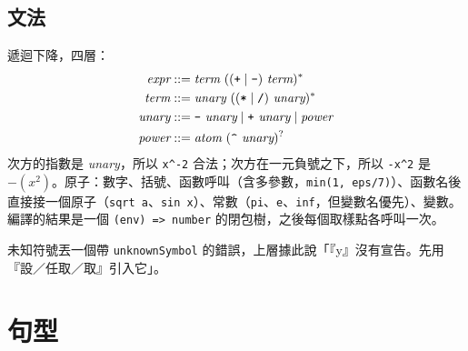 \documentclass[11pt,a4paper,oneside]{book}
\renewcommand{\_}{\ifmmode\origunderscore\else\textunderscore\allowbreak\fi}
\newcommand{\code}[1]{\texttt{#1}}
\begin{document}
\section{文法}
遞迴下降，四層：
\[
\begin{aligned}
\textit{expr} &::= \textit{term}\ ((\texttt{+}\mid\texttt{-})\ \textit{term})^* \\
\textit{term} &::= \textit{unary}\ ((\texttt{*}\mid\texttt{/})\ \textit{unary})^* \\
\textit{unary} &::= \texttt{-}\ \textit{unary} \mid \texttt{+}\ \textit{unary} \mid \textit{power} \\
\textit{power} &::= \textit{atom}\ (\texttt{\string^}\ \textit{unary})^?
\end{aligned}
\]
次方的指數是 \textit{unary}，所以 \code{x\string^-2} 合法；次方在一元負號之下，所以 \code{-x\string^2} 是 $-(x^2)$。原子：數字、括號、函數呼叫（含多參數，\code{min(1, eps/7)}）、函數名後直接接一個原子（\code{sqrt a}、\code{sin x}）、常數（\code{pi}、\code{e}、\code{inf}，但變數名優先）、變數。編譯的結果是一個 \code{(env) => number} 的閉包樹，之後每個取樣點各呼叫一次。

未知符號丟一個帶 \code{unknownSymbol} 的錯誤，上層據此說「『y』沒有宣告。先用『設／任取／取』引入它」。

\chapter{句型}
\end{document}
